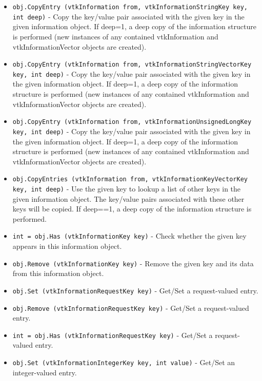 \begin{itemize}
\item  \verb|obj.CopyEntry (vtkInformation from, vtkInformationStringKey key, int deep)| -  Copy the key/value pair associated with the given key in the
 given information object.  If deep=1, a deep copy of the information
 structure is performed (new instances of any contained vtkInformation and
 vtkInformationVector objects are created).

\item  \verb|obj.CopyEntry (vtkInformation from, vtkInformationStringVectorKey key, int deep)| -  Copy the key/value pair associated with the given key in the
 given information object.  If deep=1, a deep copy of the information
 structure is performed (new instances of any contained vtkInformation and
 vtkInformationVector objects are created).

\item  \verb|obj.CopyEntry (vtkInformation from, vtkInformationUnsignedLongKey key, int deep)| -  Copy the key/value pair associated with the given key in the
 given information object.  If deep=1, a deep copy of the information
 structure is performed (new instances of any contained vtkInformation and
 vtkInformationVector objects are created).

\item  \verb|obj.CopyEntries (vtkInformation from, vtkInformationKeyVectorKey key, int deep)| -  Use the given key to lookup a list of other keys in the given
 information object.  The key/value pairs associated with these
 other keys will be copied.  If deep==1, a deep copy of the
 information structure is performed.

\item  \verb|int = obj.Has (vtkInformationKey key)| -  Check whether the given key appears in this information object.

\item  \verb|obj.Remove (vtkInformationKey key)| -  Remove the given key and its data from this information object.

\item  \verb|obj.Set (vtkInformationRequestKey key)| -  Get/Set a request-valued entry.

\item  \verb|obj.Remove (vtkInformationRequestKey key)| -  Get/Set a request-valued entry.

\item  \verb|int = obj.Has (vtkInformationRequestKey key)| -  Get/Set a request-valued entry.

\item  \verb|obj.Set (vtkInformationIntegerKey key, int value)| -  Get/Set an integer-valued entry.


\end{itemize}
